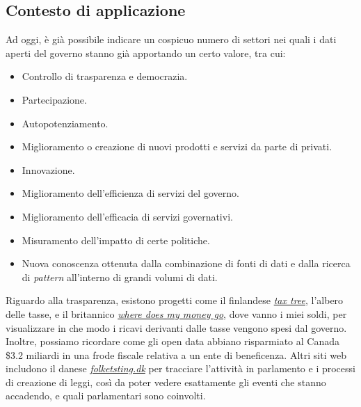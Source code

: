 

\subsection{Contesto di applicazione}
Ad oggi, è già possibile indicare un cospicuo numero di settori nei quali i dati aperti del governo stanno già apportando un certo valore, tra cui:

\begin{itemize}
    \item Controllo di trasparenza e democrazia.
    \item Partecipazione.
    \item Autopotenziamento.
    \item Miglioramento o creazione di nuovi prodotti e servizi da parte di privati.
    \item Innovazione.
    \item Miglioramento dell'efficienza di servizi del governo.
    \item Miglioramento dell'efficacia di servizi governativi.
    \item Misuramento dell'impatto di certe politiche.
    \item Nuova conoscenza ottenuta dalla combinazione di fonti di dati e dalla ricerca di \textit{pattern} all'interno di grandi volumi di dati.
\end{itemize}

Riguardo alla trasparenza, esistono progetti come il finlandese \textit{\href{https://www.valtionbudjetti.fi/}{tax tree}}, l'albero delle tasse, e il britannico \textit{\href{https://github.com/openspending/wheredoesmymoneygo.org}{where does my money go}}, dove vanno i miei soldi, per visualizzare in che modo i ricavi derivanti dalle tasse vengono spesi dal governo. Inoltre, possiamo ricordare come gli open data abbiano risparmiato al Canada \$3.2 miliardi in una frode fiscale relativa a un ente di beneficenza. Altri siti web includono il danese \textit{\href{https://github.com/friism/folketsting}{folketsting.dk}} per tracciare l'attività in parlamento e i processi di creazione di leggi, così da poter vedere esattamente gli eventi che stanno accadendo, e quali parlamentari sono coinvolti.

